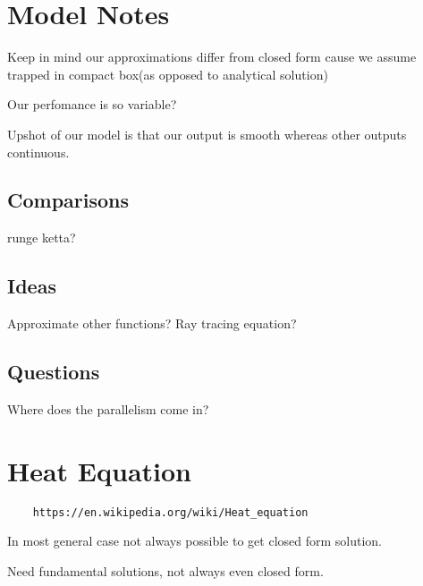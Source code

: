 \documentclass[10pt]{article}
\newcommand{\1}{\textbf{1}}
\theoremstyle{remark}
\theoremstyle{definition}
\begin{document}
\section{Model Notes}

Keep in mind our approximations differ from closed form cause we assume trapped in compact box(as opposed to analytical solution)

Our perfomance is so variable?

Upshot of our model is that our output is smooth whereas other outputs continuous.


\subsection{Comparisons}

runge ketta?

\subsection{Ideas}

Approximate other functions? Ray tracing equation?

\subsection{Questions}

Where does the parallelism come in?

\section{Heat Equation}

\begin{verbatim}
	https://en.wikipedia.org/wiki/Heat_equation
\end{verbatim}

In most general case not always possible to get closed form solution. 

Need fundamental solutions, not always even closed form.
\end{document}
